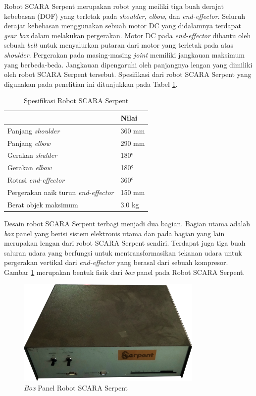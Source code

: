 Robot SCARA Serpent merupakan robot yang meiliki tiga buah derajat kebebasan (DOF) yang terletak pada \textit{shoulder}, \textit{elbow}, dan \textit{end-effector}. Seluruh derajat kebebasan menggunakan sebuah motor DC yang didalamnya terdapat\textit{ gear box} dalam melakukan pergerakan. Motor DC pada \textit{end-effector} dibantu oleh sebuah \textit{belt} untuk menyalurkan putaran dari motor yang terletak pada atas \textit{shoulder}. Pergerakan pada masing-masing \textit{joint} memiliki jangkauan maksimum yang berbeda-beda. Jangkauan dipengaruhi oleh panjangnya lengan yang dimiliki oleh robot SCARA Serpent tersebut\cite{bulet}. Spesifikasi dari robot SCARA Serpent yang digunakan pada penelitian ini ditunjukkan pada Tabel \ref{tbl.elektronisSCARA}. 


\begin{table}[H]
	\centering 
	\caption{Spesifikasi Robot SCARA Serpent}
	\label{tbl.elektronisSCARA}
	\begin{tabular}{|l|l|}
		\hline
		\rowcolor[HTML]{9B9B9B} 
		\multicolumn{1}{|c|}{\cellcolor[HTML]{9B9B9B}Keterangan} & Nilai \\ \hline
		Panjang \textit{shoulder} & 360 mm \\ \hline
		Panjang \textit{elbow} & 290 mm \\ \hline
		Gerakan \textit{shulder} & 180° \\ \hline
		Gerakan \textit{elbow} & 180° \\ \hline
		Rotasi \textit{end-effector} & 360° \\ \hline
		Pergerakan naik turun \textit{end-effector} & 150 mm \\ \hline
		Berat objek maksimum & 3.0 kg \\ \hline
	\end{tabular}
\end{table}

Desain robot SCARA Serpent terbagi menjadi dua bagian. Bagian utama adalah \textit{box} panel yang berisi sistem elektronis utama dan pada bagian yang lain merupakan lengan dari robot SCARA Serpent sendiri. Terdapat juga tiga buah saluran udara yang berfungsi untuk mentransformasikan tekanan udara untuk pergerakan vertikal dari \textit{end-effector} yang berasal dari sebuah kompresor. Gambar \ref{pic.boxpanel} merupakan bentuk fisik dari \textit{box} panel pada Robot SCARA Serpent.
\begin{figure}[H]
	\centering
	\includegraphics[width=9cm]{gambar/boxpanel.png}
	\caption{\textit{Box} Panel Robot SCARA Serpent}
	\label{pic.boxpanel}
\end{figure}

